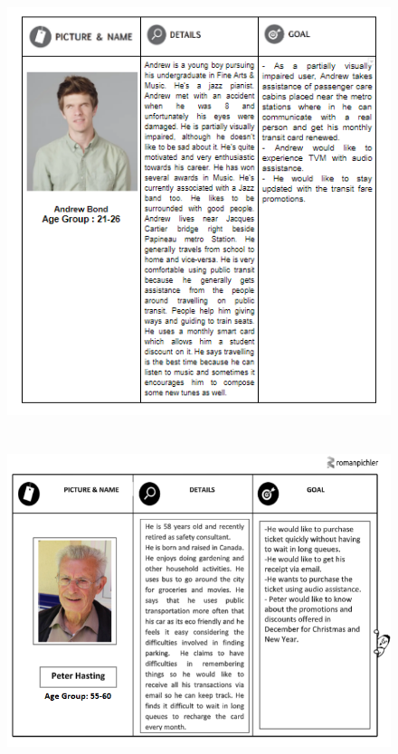\documentclass[12pt]{report}
\begin{document}
\begin{figure}[h!]
\begin{center}
  \includegraphics[width=12cm, height=13cm]{Images/Persona_Jatan.png}
  \end{center}
\end{figure}

\begin{figure}[h!]
\begin{center}
  \includegraphics[width=12cm, height=8.8cm]{Images/Persona_Kundana.png}
  \end{center}
\end{figure}
\end{document}
